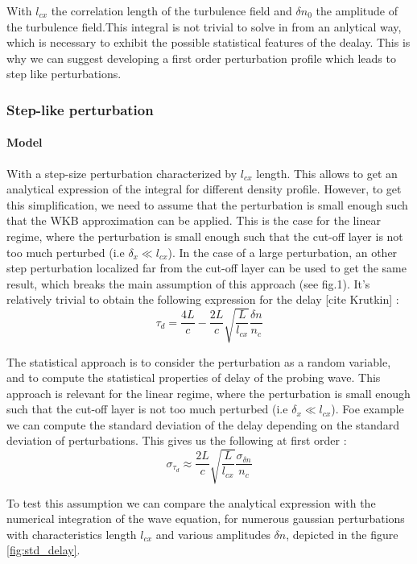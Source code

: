 \documentclass[11pt,a4paper,openany]{report}
\begin{document}
\begin{multicols}{2}
    With $l_{cx}$ the correlation length of the turbulence field and $\delta n_0$ the amplitude of the turbulence field.This integral is not trivial to solve in from an anlytical way, which is necessary to exhibit the possible statistical features of the dealay. This is why we can suggest developing a first order perturbation profile which leads to step like perturbations.

    \subsubsection{Step-like perturbation}
    \paragraph{Model}

    With a step-size perturbation characterized by $l_{cx}$ length. This allows to get an analytical expression of the integral for different density profile. However, to get this simplification, we need to assume that the perturbation is small enough such that the WKB approximation can be applied.
    This is the case for the linear regime, where the perturbation is small enough such that the cut-off layer is not too much perturbed (i.e $\delta_x \ll l_{cx}$). In the case of a large perturbation, an other step perturbation localized far from the cut-off layer can be used to get the same result, which breaks the main assumption of this approach (see fig.1).
    It's relatively trivial to obtain the following expression for the delay [cite Krutkin] :
    $$\tau_d = \frac{4L}{c} - \frac{2L}{c}\sqrt{\frac{L}{l_{cx}}}\frac{\delta n}{n_c} $$

    The statistical approach is to consider the perturbation as a random variable, and to compute the statistical properties of delay of the probing wave. This approach is relevant for the linear regime, where the perturbation is small enough such that the cut-off layer is not too much perturbed (i.e $\delta_x \ll l_{cx}$). Foe example we can compute the standard deviation of the delay depending on the standard deviation of perturbations.
    This gives us the following at first order :
    $$\sigma_{\tau_d} \approx \frac{2L}{c}\sqrt{\frac{L}{l_{cx}}}\frac{\sigma_{\delta n}}{n_c}$$

    To test this assumption we can compare the analytical expression with the numerical integration of the wave equation, for numerous gaussian perturbations with characteristics length $l_{cx}$ and various amplitudes $\delta n$, depicted in the figure \ref{fig:std_delay}.
\end{multicols}
\end{document}
